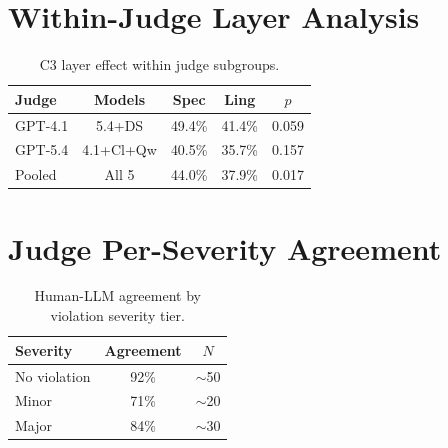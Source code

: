 \documentclass[11pt,a4paper]{article}
\begin{document}
\section{Within-Judge Layer Analysis}

\begin{table}[h]
\centering
\small
\caption{C3 layer effect within judge subgroups.}
\label{tab:within-judge}
\begin{tabular}{lcccc}
\toprule
Judge & Models & Spec & Ling & $p$ \\
\midrule
GPT-4.1 & 5.4+DS & 49.4\% & 41.4\% & 0.059 \\
GPT-5.4 & 4.1+Cl+Qw & 40.5\% & 35.7\% & 0.157 \\
Pooled & All 5 & 44.0\% & 37.9\% & 0.017 \\
\bottomrule
\end{tabular}
\end{table}

\section{Judge Per-Severity Agreement}

\begin{table}[h]
\centering
\small
\caption{Human-LLM agreement by violation severity tier.}
\label{tab:severity}
\begin{tabular}{lcc}
\toprule
Severity & Agreement & $N$ \\
\midrule
No violation & 92\% & $\sim$50 \\
Minor & 71\% & $\sim$20 \\
Major & 84\% & $\sim$30 \\
\bottomrule
\end{tabular}
\end{table}
\end{document}
